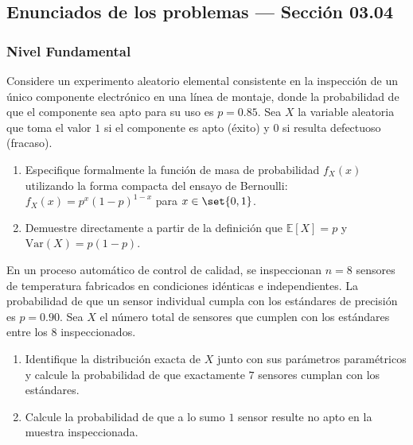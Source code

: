 
\subsection*{Enunciados de los problemas --- Sección 03.04}

\subsubsection*{Nivel Fundamental}

\begin{problema}
	\label{prob:3.4.1}
	Considere un experimento aleatorio elemental consistente en la inspección de un único componente electrónico en una línea de montaje, donde la probabilidad de que el componente sea apto para su uso es $p = 0.85$. Sea $X$ la variable aleatoria que toma el valor $1$ si el componente es apto (éxito) y $0$ si resulta defectuoso (fracaso).
	\begin{enumerate}
		\item Especifique formalmente la función de masa de probabilidad $f_X(x)$ utilizando la forma compacta del ensayo de Bernoulli: $f_X(x) = p^x (1-p)^{1-x}$ para $x \in \set{0, 1}$.
		\item Demuestre directamente a partir de la definición que $\mathbb{E}[X] = p$ y $\text{Var}(X) = p(1-p)$.
	\end{enumerate}
\end{problema}

\begin{problema}
	\label{prob:3.4.2}
	En un proceso automático de control de calidad, se inspeccionan $n = 8$ sensores de temperatura fabricados en condiciones idénticas e independientes. La probabilidad de que un sensor individual cumpla con los estándares de precisión es $p = 0.90$. Sea $X$ el número total de sensores que cumplen con los estándares entre los $8$ inspeccionados.
	\begin{enumerate}
		\item Identifique la distribución exacta de $X$ junto con sus parámetros paramétricos y calcule la probabilidad de que exactamente $7$ sensores cumplan con los estándares.
		\item Calcule la probabilidad de que a lo sumo $1$ sensor resulte no apto en la muestra inspeccionada.
	\end{enumerate}
\end{problema}

